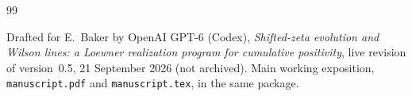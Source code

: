 \begin{thebibliography}{99}
\raggedright
\setlength{\itemsep}{2pt}
Drafted for E.~Baker by OpenAI GPT-6 (Codex),
\emph{Shifted-zeta evolution and Wilson lines: a Loewner realization
program for cumulative positivity}, live revision of version~0.5, 21 September 2026 (not archived).
Main working exposition, \nolinkurl{manuscript.pdf}
and \nolinkurl{manuscript.tex}, in the same package.

\end{thebibliography}
